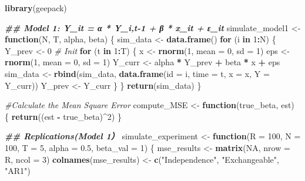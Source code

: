 \documentclass[
]{article}
\newenvironment{Shaded}{\begin{snugshade}}{\end{snugshade}}
\newcommand{\AttributeTok}[1]{\textcolor[rgb]{0.13,0.29,0.53}{#1}}
\newcommand{\CommentTok}[1]{\textcolor[rgb]{0.56,0.35,0.01}{\textit{#1}}}
\newcommand{\ConstantTok}[1]{\textcolor[rgb]{0.56,0.35,0.01}{#1}}
\newcommand{\ControlFlowTok}[1]{\textcolor[rgb]{0.13,0.29,0.53}{\textbf{#1}}}
\newcommand{\DecValTok}[1]{\textcolor[rgb]{0.00,0.00,0.81}{#1}}
\newcommand{\DocumentationTok}[1]{\textcolor[rgb]{0.56,0.35,0.01}{\textbf{\textit{#1}}}}
\newcommand{\FloatTok}[1]{\textcolor[rgb]{0.00,0.00,0.81}{#1}}
\newcommand{\FunctionTok}[1]{\textcolor[rgb]{0.13,0.29,0.53}{\textbf{#1}}}
\newcommand{\NormalTok}[1]{#1}
\newcommand{\OtherTok}[1]{\textcolor[rgb]{0.56,0.35,0.01}{#1}}
\newcommand{\SpecialCharTok}[1]{\textcolor[rgb]{0.81,0.36,0.00}{\textbf{#1}}}
\newcommand{\StringTok}[1]{\textcolor[rgb]{0.31,0.60,0.02}{#1}}
\begin{document}
\begin{Shaded}
\begin{Highlighting}[]
\FunctionTok{library}\NormalTok{(geepack)}

\DocumentationTok{\#\# Model 1: Y\_it = α * Y\_i,t{-}1 + β * x\_it + ε\_it}
\NormalTok{simulate\_model1 }\OtherTok{\textless{}{-}} \ControlFlowTok{function}\NormalTok{(N, T, alpha, beta) \{}
\NormalTok{  sim\_data }\OtherTok{\textless{}{-}} \FunctionTok{data.frame}\NormalTok{()}
  \ControlFlowTok{for}\NormalTok{ (i }\ControlFlowTok{in} \DecValTok{1}\SpecialCharTok{:}\NormalTok{N) \{}
\NormalTok{    Y\_prev }\OtherTok{\textless{}{-}} \DecValTok{0}  \CommentTok{\# Init}
    \ControlFlowTok{for}\NormalTok{ (t }\ControlFlowTok{in} \DecValTok{1}\SpecialCharTok{:}\NormalTok{T) \{}
\NormalTok{      x }\OtherTok{\textless{}{-}} \FunctionTok{rnorm}\NormalTok{(}\DecValTok{1}\NormalTok{, }\AttributeTok{mean =} \DecValTok{0}\NormalTok{, }\AttributeTok{sd =} \DecValTok{1}\NormalTok{)}
\NormalTok{      eps }\OtherTok{\textless{}{-}} \FunctionTok{rnorm}\NormalTok{(}\DecValTok{1}\NormalTok{, }\AttributeTok{mean =} \DecValTok{0}\NormalTok{, }\AttributeTok{sd =} \DecValTok{1}\NormalTok{)}
\NormalTok{      Y\_curr }\OtherTok{\textless{}{-}}\NormalTok{ alpha }\SpecialCharTok{*}\NormalTok{ Y\_prev }\SpecialCharTok{+}\NormalTok{ beta }\SpecialCharTok{*}\NormalTok{ x }\SpecialCharTok{+}\NormalTok{ eps}
\NormalTok{      sim\_data }\OtherTok{\textless{}{-}} \FunctionTok{rbind}\NormalTok{(sim\_data, }\FunctionTok{data.frame}\NormalTok{(}\AttributeTok{id =}\NormalTok{ i, }\AttributeTok{time =}\NormalTok{ t, }\AttributeTok{x =}\NormalTok{ x, }\AttributeTok{Y =}\NormalTok{ Y\_curr))}
\NormalTok{      Y\_prev }\OtherTok{\textless{}{-}}\NormalTok{ Y\_curr}
\NormalTok{    \}}
\NormalTok{  \}}
  \FunctionTok{return}\NormalTok{(sim\_data)}
\NormalTok{\}}

\CommentTok{\#Calculate the Mean Square Error}
\NormalTok{compute\_MSE }\OtherTok{\textless{}{-}} \ControlFlowTok{function}\NormalTok{(true\_beta, est) \{}
  \FunctionTok{return}\NormalTok{((est }\SpecialCharTok{{-}}\NormalTok{ true\_beta)}\SpecialCharTok{\^{}}\DecValTok{2}\NormalTok{)}
\NormalTok{\}}

\DocumentationTok{\#\# Replications(Model 1）}
\NormalTok{simulate\_experiment }\OtherTok{\textless{}{-}} \ControlFlowTok{function}\NormalTok{(}\AttributeTok{R =} \DecValTok{100}\NormalTok{, }\AttributeTok{N =} \DecValTok{100}\NormalTok{, }\AttributeTok{T =} \DecValTok{5}\NormalTok{, }\AttributeTok{alpha =} \FloatTok{0.5}\NormalTok{, }\AttributeTok{beta\_val =} \DecValTok{1}\NormalTok{) \{}
\NormalTok{  mse\_results }\OtherTok{\textless{}{-}} \FunctionTok{matrix}\NormalTok{(}\ConstantTok{NA}\NormalTok{, }\AttributeTok{nrow =}\NormalTok{ R, }\AttributeTok{ncol =} \DecValTok{3}\NormalTok{)}
  \FunctionTok{colnames}\NormalTok{(mse\_results) }\OtherTok{\textless{}{-}} \FunctionTok{c}\NormalTok{(}\StringTok{"Independence"}\NormalTok{, }\StringTok{"Exchangeable"}\NormalTok{, }\StringTok{"AR1"}\NormalTok{)}
  

\end{Highlighting}
\end{Shaded}
\end{document}
